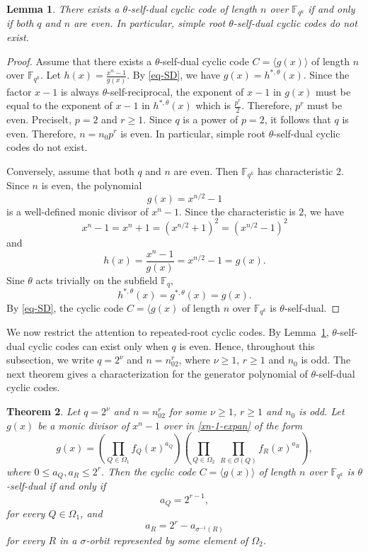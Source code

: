 \documentclass[pdflatex,sn-mathphys-num]{sn-jnl}%
\theoremstyle{thmstyleone}%
\newtheorem{theorem}{Theorem}%
\newtheorem{lemma}[theorem]{Lemma}%
\theoremstyle{thmstyletwo}%
\theoremstyle{thmstylethree}%
\newcommand{\F}{\mathbb{F}}
\begin{document}
\begin{lemma}\label{lem:selfdual-even}
There exists a $\theta$-self-dual cyclic code of length $n$ over $\F_{q^k}$ if and only if both $q$ and $n$ are even. In particular, simple root $\theta$-self-dual cyclic codes do not exist.
\end{lemma}

\begin{proof}
Assume that  there exists a $\theta$-self-dual cyclic code $
C=\langle g(x)\rangle$ 
of length $n$ over $\F_{q^k}$. Let
$
h(x)=\frac{x^n-1}{g(x)}$.
By \eqref{eq-SD}, we have 
$
g(x)=h^{\ast,\theta}(x)$. Since  the factor $x-1$ is always $\theta$-self-reciprocal,  the exponent of $x-1$ in $g(x)$ must be equal to the exponent of $x-1$ in $h^{\ast,\theta}(x)$ which is 
$
\frac{p^r}{2}.
$
Therefore, $p^r$ must be even. Preciselt,  $p=2$ and $r\geq 1$. Since $q$ is a power of $p=2$, it follows that $q$ is even.  Therefore, $n=n_0p^r$ is even. In particular, simple root $\theta$-self-dual cyclic codes do not exist.

 
Conversely, assume that both $q$ and $n$ are even. Then  $\F_{q^k}$ has characteristic $2$. Since $n$ is even, the polynomial
\[
g(x)=x^{n/2}-1
\]
is  a well-defined monic divisor of  $x^n-1$.  
Since  the characteristic is $2$, we have
\[
x^n-1=x^n+1=(x^{n/2}+1)^2=(x^{n/2}-1)^2
\]
and 
\[
h(x)=\frac{x^n-1}{g(x)}=x^{n/2}-1=g(x).
\]
Sine $\theta$ acts trivially on the subfield $\F_q$,
\[
h^{\ast,\theta}(x)=g^{\ast,\theta}(x)=g(x).
\] 
By \eqref{eq-SD}, the cyclic code $C=\langle g(x)$  of length $n$ over $\F_{q^k}$ is $\theta$-self-dual. 
\end{proof}

We now restrict the  attention to repeated-root cyclic codes. By Lemma~\ref{lem:selfdual-even}, $\theta$-self-dual cyclic codes can exist only when $q$ is even. Hence, throughout this subsection, we write $
q=2^\nu $ and $
n=n_02^r$,
where $\nu\ge1$, $r\ge 1$ and $n_0$ is odd. 
The next theorem gives a      characterization for the generator polynomial of $\theta$-self-dual  cyclic codes.


\begin{theorem}\label{thm:rr-selfdual-general} Let $
q=2^\nu $ and $
n=n_02^r$ for some  $\nu\ge 1$, $r\ge 1$ and $n_0$ is odd. 
Let  $g(x)$ be a monic divisor of $x^n-1$ over  in \eqref{xn-1-expan} of the form
\[
g(x)=
\left(\prod_{Q\in \Omega_1} f_Q(x)^{a_Q}\right)
\left(\prod_{Q\in \Omega_2}\ \prod_{R\in \mathcal O(Q)} f_R(x)^{a_R}\right),
\]
where $
0\le a_Q,a_R\le 2^r$.
Then the cyclic code
$
C=\langle g(x)\rangle$  of length  $n$ over $\F_{q^k}$
is $\theta$-self-dual if and only if
\[
a_Q=2^{r-1},
\]
for every $Q\in \Omega_1$, and
\[
a_R=2^r-a_{\sigma^{-1}(R)}
\]
for every $R$ in 
  a $\sigma$-orbit represented by some element of $\Omega_2$.
\end{theorem}
\end{document}
